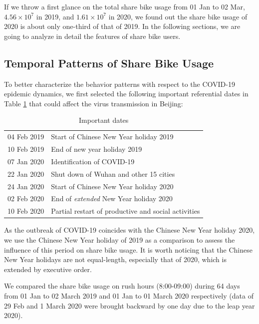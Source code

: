 \documentclass[ijgi,submit,moreauthors,pdftex]{Definitions/mdpi}
\begin{document}
If we throw a first glance on the total share bike usage from 01 Jan to 02 Mar, $4.56\times10^7$ in 2019, and $1.61\times10^7$ in 2020, we found out the share bike usage of 2020 is about only one-third of that of 2019.
In the following sections, we are going to analyze in detail the features of share bike users.

\subsection{Temporal Patterns of Share Bike Usage}
To better characterize the behavior patterns with respect to the COVID-19 epidemic dynamics, we first selected the following important referential dates in Table \ref{tab:important_dates} that could affect the virus transmission in Beijing: 

\begin{table}[ht]
    \centering
    \begin{tabular}{ll}
    04 Feb 2019 & Start of Chinese New Year holiday 2019\\
    10 Feb 2019 & End of new year holiday 2019\\
    07 Jan 2020 & Identification of COVID-19\\
    22 Jan 2020 & Shut down of Wuhan and other 15 cities\\
    24 Jan 2020 & Start of Chinese New Year holiday 2020\\
    02 Feb 2020 & End of \textit{extended} New Year holiday 2020\\
    10 Feb 2020 & Partial restart of productive and social activities
    \end{tabular}
    \caption{Important dates}
    \label{tab:important_dates}
\end{table}

As the outbreak of COVID-19 coincides with the Chinese New Year holiday 2020, we use the Chinese New Year holiday of 2019 as a comparison to assess the influence of this period on share bike usage.
It is worth noticing that the Chinese New Year holidays are not equal-length, especially that of 2020, which is extended by executive order.

We compared the share bike usage on rush hours (8:00-09:00) during 64 days from 01 Jan to 02 March 2019 and 01 Jan to 01 March 2020 respectively (data of 29 Feb and 1 March 2020 were brought backward by one day due to the leap year 2020).
\end{document}
